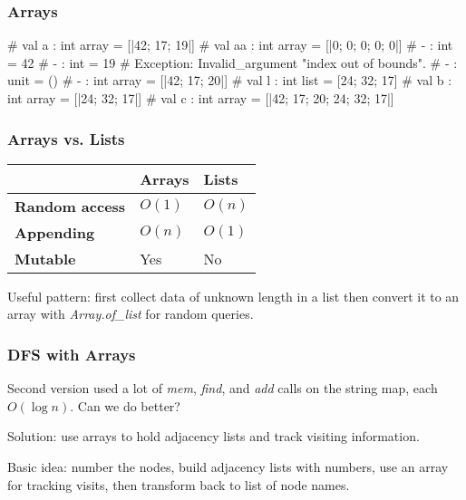 \documentclass{plt}
\begin{document}
\begin{frame}[fragile]
  \frametitle{Arrays}

\begin{interactive}
# 
val a : int array = [|42; 17; 19|]
# 
val aa : int array = [|0; 0; 0; 0; 0|]
# 
- : int = 42
# 
- : int = 19
# 
Exception: Invalid_argument "index out of bounds".
# 
- : unit = ()
# 
- : int array = [|42; 17; 20|]
# 
val l : int list = [24; 32; 17]
# 
val b : int array = [|24; 32; 17|]
# 
val c : int array = [|42; 17; 20; 24; 32; 17|]
\end{interactive}

\end{frame}

\begin{frame}
  \frametitle{Arrays vs. Lists}

  \begin{center}
    \begin{tabular}{lll}
\toprule
& \textbf{Arrays} & \textbf{Lists} \\
\midrule
\textbf{Random access} & $O(1)$ & $O(n)$ \\
\textbf{Appending} & $O(n)$ & $O(1)$ \\
\textbf{Mutable} & Yes & No \\
\bottomrule
    \end{tabular}
  \end{center}

\medskip

Useful pattern: first collect data of unknown length in a list then
convert it to an array with \emph{Array.of\_list} for random queries.

\end{frame}

\begin{frame}
  \frametitle{DFS with Arrays}

Second version used a lot of \emph{mem}, \emph{find}, and \emph{add}
calls on the string map, each $O(\log n)$.  Can we do better?

Solution: use arrays to hold adjacency lists and track visiting
information.

Basic idea: number the nodes, build adjacency lists with numbers, use
an array for tracking visits, then transform back to list of node names.

\end{frame}
\end{document}

